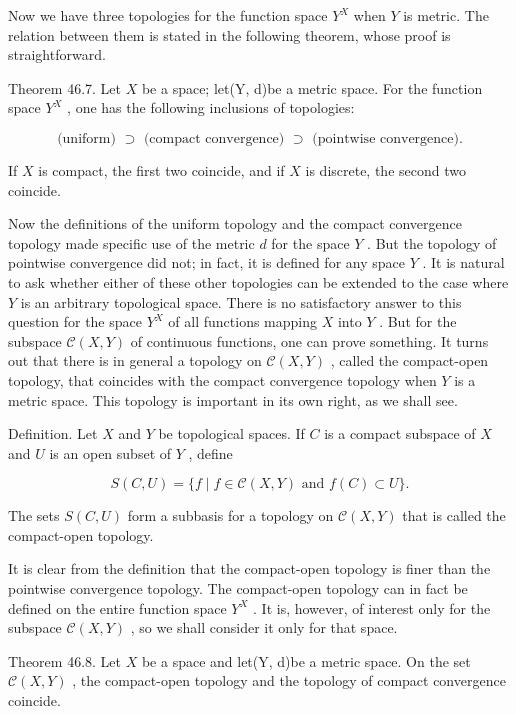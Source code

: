 Now we have three topologies for the function space \({Y}^{X}\) when \(Y\) is metric. The relation between them is stated in the following theorem, whose proof is straightforward.

Theorem 46.7. Let \(X\) be a space; let(Y, d)be a metric space. For the function space \({Y}^{X}\) , one has the following inclusions of topologies:

\[
\text{ (uniform) } \supset  \text{ (compact convergence) } \supset  \text{ (pointwise convergence). }
\]

If \(X\) is compact, the first two coincide, and if \(X\) is discrete, the second two coincide.

Now the definitions of the uniform topology and the compact convergence topology made specific use of the metric \(d\) for the space \(Y\) . But the topology of pointwise convergence did not; in fact, it is defined for any space \(Y\) . It is natural to ask whether either of these other topologies can be extended to the case where \(Y\) is an arbitrary topological space. There is no satisfactory answer to this question for the space \({Y}^{X}\) of all functions mapping \(X\) into \(Y\) . But for the subspace \(\mathcal{C}\left( {X,Y}\right)\) of continuous functions, one can prove something. It turns out that there is in general a topology on \(\mathcal{C}\left( {X,Y}\right)\) , called the compact-open topology, that coincides with the compact convergence topology when \(Y\) is a metric space. This topology is important in its own right, as we shall see.

Definition. Let \(X\) and \(Y\) be topological spaces. If \(C\) is a compact subspace of \(X\) and \(U\) is an open subset of \(Y\) , define

\[
S\left( {C,U}\right)  = \{ f \mid  f \in  \mathcal{C}\left( {X,Y}\right) \text{ and }f\left( C\right)  \subset  U\} .
\]

The sets \(S\left( {C,U}\right)\) form a subbasis for a topology on \(\mathcal{C}\left( {X,Y}\right)\) that is called the compact-open topology.

It is clear from the definition that the compact-open topology is finer than the pointwise convergence topology. The compact-open topology can in fact be defined on the entire function space \({Y}^{X}\) . It is, however, of interest only for the subspace \(\mathcal{C}\left( {X,Y}\right)\) , so we shall consider it only for that space.

Theorem 46.8. Let \(X\) be a space and let(Y, d)be a metric space. On the set \(\mathcal{C}\left( {X,Y}\right)\) , the compact-open topology and the topology of compact convergence coincide.

